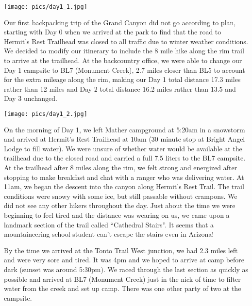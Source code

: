\documentclass[10pt,a4paper]{article}
\newenvironment{Figure}
  {\par\medskip\noindent\minipage{\linewidth}}
  {\endminipage\par\medskip}
\begin{document}
\begin{multicols}{2}
\begin{Figure}
 \centering
 \texttt{[image: pics/day1\_1.jpg]}
\end{Figure}

Our first backpacking trip of the Grand Canyon did not go according to plan, starting with Day 0 when we arrived at the park to find that the road to Hermit's Rest Trailhead was closed to all traffic due to winter weather conditions. We decided to modify our itinerary to include the 8 mile hike along the rim trail to arrive at the trailhead. At the backcountry office, we were able to change our Day 1 campsite to BL7 (Monument Creek), 2.7 miles closer than BL5 to account for the extra mileage along the rim, making our Day 1 total distance 17.3 miles rather than 12 miles and Day 2 total distance 16.2 miles rather than 13.5 and Day 3 unchanged. \\

\begin{Figure}
 \centering
 \texttt{[image: pics/day1\_2.jpg]}
\end{Figure}

On the morning of Day 1, we left Mather campground at 5:20am in a snowstorm and arrived at Hermit's Rest Trailhead at 10am (30 minute stop at Bright Angel Lodge to fill water). We were unsure of whether water would be available at the trailhead due to the closed road and carried a full 7.5 liters to the BL7 campsite. At the trailhead after 8 miles along the rim, we felt strong and energized after stopping to make breakfast and chat with a ranger who was delivering water. At 11am, we began the descent into the canyon along Hermit's Rest Trail. The trail conditions were snowy with some ice, but still passable without crampons. We did not see any other hikers throughout the day. Just about the time we were beginning to feel tired and the distance was wearing on us, we came upon a landmark section of the trail called “Cathedral Stairs”. It seems that a mountaineering school student can't escape the stairs even in Arizona! 


By the time we arrived at the Tonto Trail West junction, we had 2.3 miles left and were very sore and tired. It was 4pm and we hoped to arrive at camp before dark (sunset was around 5:30pm). We raced through the last section as quickly as possible and arrived at BL7 (Monument Creek) just in the nick of time to filter water from the creek and set up camp. There was one other party of two at the campsite.


\end{multicols}
\end{document}
